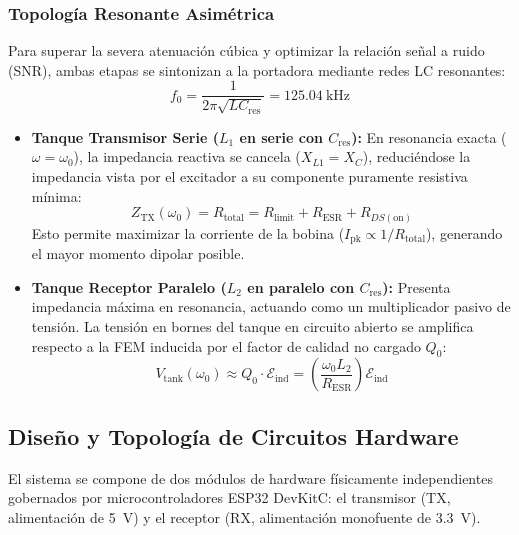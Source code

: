 \subsubsection{Topología Resonante Asimétrica}
Para superar la severa atenuación cúbica y optimizar la relación señal a ruido (SNR), ambas etapas se sintonizan a la portadora mediante redes LC resonantes:
\begin{equation}
    f_0 = \frac{1}{2\pi \sqrt{L C_{\text{res}}}} = \SI{125.04}{\kilo\hertz}
    \label{eq:frecuencia_resonancia}
\end{equation}
\begin{itemize}
    \item \textbf{Tanque Transmisor Serie ($L_1$ en serie con $C_{\text{res}}$):} En resonancia exacta ($\omega = \omega_0$), la impedancia reactiva se cancela ($X_{L1} = X_C$), reduciéndose la impedancia vista por el excitador a su componente puramente resistiva mínima:
    \begin{equation}
        Z_{\text{TX}}(\omega_0) = R_{\text{total}} = R_{\text{limit}} + R_{\text{ESR}} + R_{DS(\text{on})}
        \label{eq:ztx_min}
    \end{equation}
    Esto permite maximizar la corriente de la bobina ($I_{\text{pk}} \propto 1/R_{\text{total}}$), generando el mayor momento dipolar posible.
    \item \textbf{Tanque Receptor Paralelo ($L_2$ en paralelo con $C_{\text{res}}$):} Presenta impedancia máxima en resonancia, actuando como un multiplicador pasivo de tensión. La tensión en bornes del tanque en circuito abierto se amplifica respecto a la FEM inducida por el factor de calidad no cargado $Q_0$:
    \begin{equation}
        V_{\text{tank}}(\omega_0) \approx Q_0 \cdot \mathcal{E}_{\text{ind}} = \left( \frac{\omega_0 L_2}{R_{\text{ESR}}} \right) \mathcal{E}_{\text{ind}}
        \label{eq:ganancia_q_pasiva}
    \end{equation}
\end{itemize}

\subsection{Diseño y Topología de Circuitos Hardware}
\label{subsec:diseno_circuitos}

El sistema se compone de dos módulos de hardware físicamente independientes gobernados por microcontroladores ESP32 DevKitC: el transmisor (TX, alimentación de \SI{5}{\volt}) y el receptor (RX, alimentación monofuente de \SI{3.3}{\volt}).


